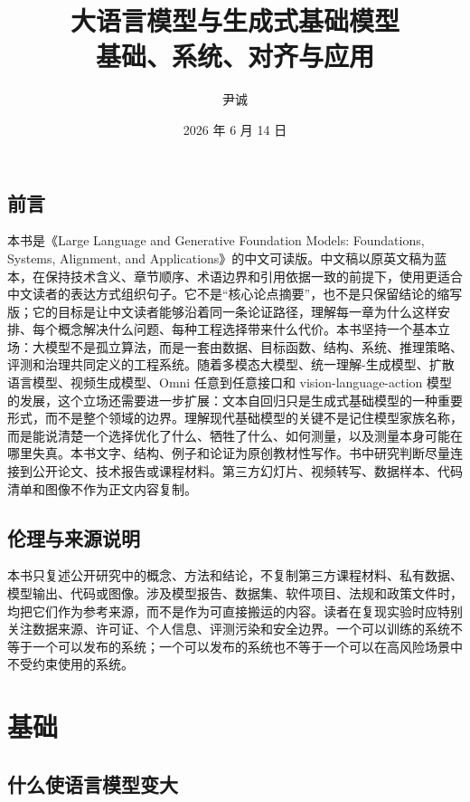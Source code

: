 \documentclass[UTF8,zihao=-4,openany]{ctexbook}
\title{大语言模型与生成式基础模型\\\large 基础、系统、对齐与应用}
\author{尹诚}
\date{2026 年 6 月 14 日}
\begin{document}
\maketitle
\frontmatter

\chapter*{前言}
{}
本书是《Large Language and Generative Foundation Models: Foundations, Systems, Alignment, and Applications》的中文可读版。中文稿以原英文稿为蓝本，在保持技术含义、章节顺序、术语边界和引用依据一致的前提下，使用更适合中文读者的表达方式组织句子。它不是“核心论点摘要”，也不是只保留结论的缩写版；它的目标是让中文读者能够沿着同一条论证路径，理解每一章为什么这样安排、每个概念解决什么问题、每种工程选择带来什么代价。本书坚持一个基本立场：大模型不是孤立算法，而是一套由数据、目标函数、结构、系统、推理策略、评测和治理共同定义的工程系统。随着多模态大模型、统一理解-生成模型、扩散语言模型、视频生成模型、Omni 任意到任意接口和 vision-language-action 模型的发展，这个立场还需要进一步扩展：文本自回归只是生成式基础模型的一种重要形式，而不是整个领域的边界。理解现代基础模型的关键不是记住模型家族名称，而是能说清楚一个选择优化了什么、牺牲了什么、如何测量，以及测量本身可能在哪里失真。本书文字、结构、例子和论证为原创教材性写作。书中研究判断尽量连接到公开论文、技术报告或课程材料。第三方幻灯片、视频转写、数据样本、代码清单和图像不作为正文内容复制。

\chapter*{伦理与来源说明}
{}
本书只复述公开研究中的概念、方法和结论，不复制第三方课程材料、私有数据、模型输出、代码或图像。涉及模型报告、数据集、软件项目、法规和政策文件时，均把它们作为参考来源，而不是作为可直接搬运的内容。读者在复现实验时应特别关注数据来源、许可证、个人信息、评测污染和安全边界。一个可以训练的系统不等于一个可以发布的系统；一个可以发布的系统也不等于一个可以在高风险场景中不受约束使用的系统。

\tableofcontents

\mainmatter

\part{基础}

\chapter{什么使语言模型变大}
\end{document}
